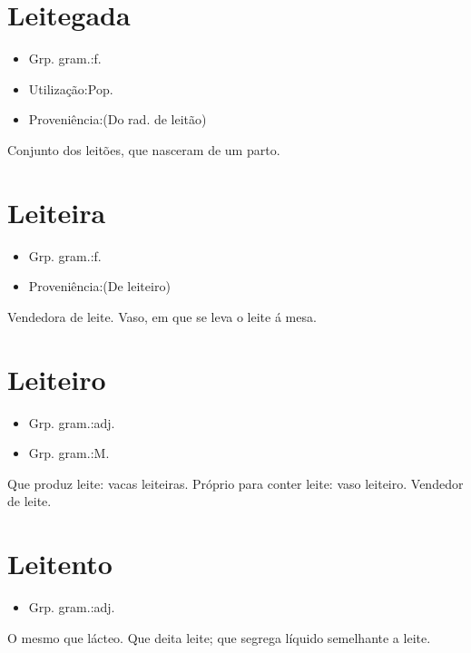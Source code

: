 \section{Leitegada}
\begin{itemize}
\item {Grp. gram.:f.}
\end{itemize}
\begin{itemize}
\item {Utilização:Pop.}
\end{itemize}
\begin{itemize}
\item {Proveniência:(Do rad. de \textunderscore leitão\textunderscore )}
\end{itemize}
Conjunto dos leitões, que nasceram de um parto.
\section{Leiteira}
\begin{itemize}
\item {Grp. gram.:f.}
\end{itemize}
\begin{itemize}
\item {Proveniência:(De \textunderscore leiteiro\textunderscore )}
\end{itemize}
Vendedora de leite.
Vaso, em que se leva o leite á mesa.
\section{Leiteiro}
\begin{itemize}
\item {Grp. gram.:adj.}
\end{itemize}
\begin{itemize}
\item {Grp. gram.:M.}
\end{itemize}
Que produz leite: \textunderscore vacas leiteiras\textunderscore .
Próprio para conter leite: \textunderscore vaso leiteiro\textunderscore .
Vendedor de leite.
\section{Leitento}
\begin{itemize}
\item {Grp. gram.:adj.}
\end{itemize}
O mesmo que \textunderscore lácteo\textunderscore .
Que deita leite; que segrega líquido semelhante a leite.
